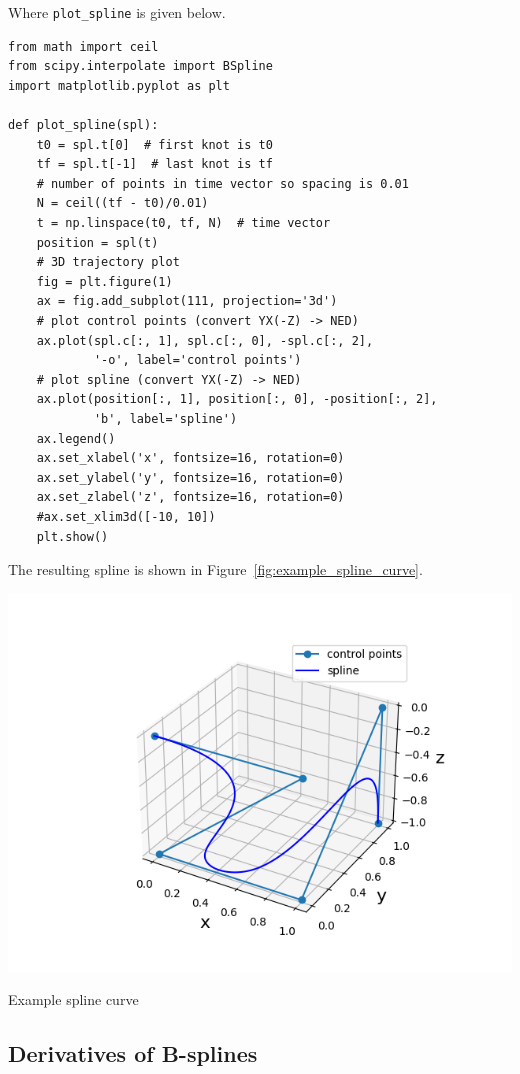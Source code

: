 Where {\tt plot\_spline} is given below.
\begin{lstlisting}
from math import ceil
from scipy.interpolate import BSpline
import matplotlib.pyplot as plt

def plot_spline(spl):
    t0 = spl.t[0]  # first knot is t0
    tf = spl.t[-1]  # last knot is tf
    # number of points in time vector so spacing is 0.01
    N = ceil((tf - t0)/0.01)
    t = np.linspace(t0, tf, N)  # time vector
    position = spl(t)
    # 3D trajectory plot
    fig = plt.figure(1)
    ax = fig.add_subplot(111, projection='3d')
    # plot control points (convert YX(-Z) -> NED)
    ax.plot(spl.c[:, 1], spl.c[:, 0], -spl.c[:, 2],
            '-o', label='control points')
    # plot spline (convert YX(-Z) -> NED)
    ax.plot(position[:, 1], position[:, 0], -position[:, 2],
            'b', label='spline')
    ax.legend()
    ax.set_xlabel('x', fontsize=16, rotation=0)
    ax.set_ylabel('y', fontsize=16, rotation=0)
    ax.set_zlabel('z', fontsize=16, rotation=0)
    #ax.set_xlim3d([-10, 10])
    plt.show()
\end{lstlisting}

The resulting spline is shown in Figure~\ref{fig:example_spline_curve}.
\begin{marginfigure}[0in]
  \includegraphics[width=\linewidth]{./chap5_trajectory_planning/figures/example_spline_curve}
  \caption{Example spline curve}
  \label{fig:example_spline_curve}  
\end{marginfigure}

\subsection{Derivatives of B-splines}

